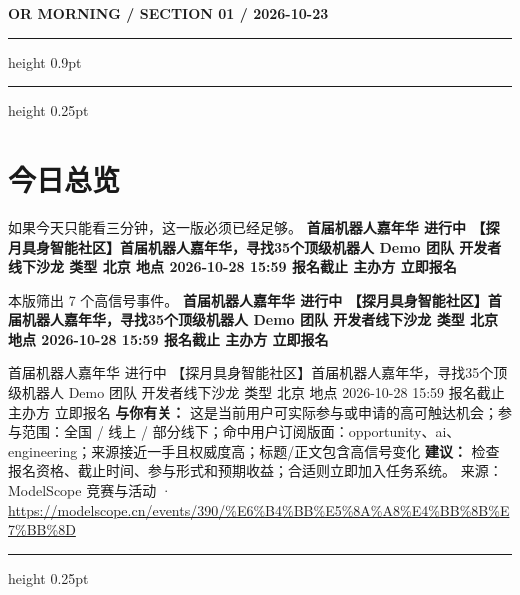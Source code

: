 \documentclass[10.5pt]{ctexart}
\begin{document}
{\small\bfseries OR MORNING / SECTION 01 / 2026-10-23}
\vspace{2mm}
\hrule height 0.9pt
\vspace{1.5mm}
\hrule height 0.25pt
\vspace{4mm}
\section*{今日总览}
{\color{ormuted} 如果今天只能看三分钟，这一版必须已经足够。}
\vspace{2mm}
{\fontsize{25}{29}\selectfont\bfseries 首届机器人嘉年华 进行中 【探月具身智能社区】首届机器人嘉年华，寻找35个顶级机器人 Demo 团队 开发者线下沙龙 类型 北京 地点 2026-10-28 15:59 报名截止 主办方 立即报名}\par
\vspace{2mm}
{\large 本版筛出 7 个高信号事件。}
\vspace{3mm}
{\Large\bfseries 首届机器人嘉年华 进行中 【探月具身智能社区】首届机器人嘉年华，寻找35个顶级机器人 Demo 团队 开发者线下沙龙 类型 北京 地点 2026-10-28 15:59 报名截止 主办方 立即报名}\par
首届机器人嘉年华 进行中 【探月具身智能社区】首届机器人嘉年华，寻找35个顶级机器人 Demo 团队 开发者线下沙龙 类型 北京 地点 2026-10-28 15:59 报名截止 主办方 立即报名
\textbf{与你有关：} 这是当前用户可实际参与或申请的高可触达机会；参与范围：全国 / 线上 / 部分线下；命中用户订阅版面：opportunity、ai、engineering；来源接近一手且权威度高；标题/正文包含高信号变化
\textbf{建议：} 检查报名资格、截止时间、参与形式和预期收益；合适则立即加入任务系统。
{\footnotesize\color{ormuted} 来源：ModelScope 竞赛与活动 · \url{https://modelscope.cn/events/390/%E6%B4%BB%E5%8A%A8%E4%BB%8B%E7%BB%8D}}
\vspace{3mm}
\hrule height 0.25pt
\vspace{3mm}
\end{document}
